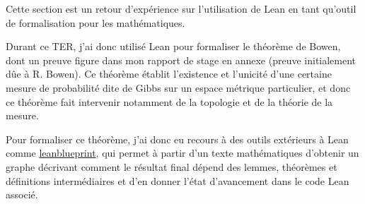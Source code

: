 \documentclass[../../rapport.tex]{subfiles}
\begin{document}
  Cette section est un retour d'expérience sur l'utilisation de Lean en tant qu'outil de formalisation pour les
  mathématiques.

  Durant ce TER, j'ai donc utilisé Lean pour formaliser le théorème de Bowen, dont un preuve figure dans mon rapport de stage
  en annexe (preuve initialement dûe à R. Bowen).
  Ce théorème établit l'existence et l'unicité d'une certaine mesure de probabilité dite de Gibbs sur un espace métrique particulier,
  et donc ce théorème fait intervenir notamment de la topologie et de la théorie de la mesure.

  Pour formaliser ce théorème, j'ai donc eu recours à des outils extérieurs à Lean comme
  \href{https://github.com/PatrickMassot/leanblueprint}{leanblueprint},
  qui permet à partir d'un texte mathématiques d'obtenir un graphe décrivant comment le résultat final dépend
  des lemmes, théorèmes et définitions intermédiaires et d'en donner l'état d'avancement dans le code Lean associé.
\end{document}
